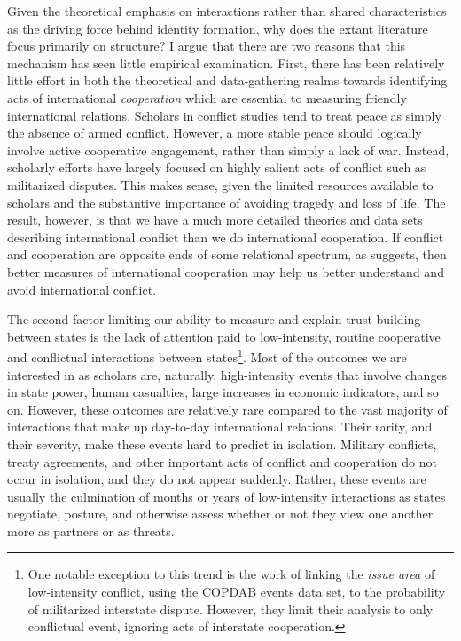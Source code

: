 \documentclass[10pt,]{article}
\begin{document}
Given the theoretical emphasis on interactions rather than shared
characteristics as the driving force behind identity formation, why does
the extant literature focus primarily on structure? I argue that there
are two reasons that this mechanism has seen little empirical
examination. First, there has been relatively little effort in both the
theoretical and data-gathering realms towards identifying acts of
international \emph{cooperation} which are essential to measuring
friendly international relations. Scholars in conflict studies tend to
treat peace as simply the absence of armed conflict. However, a more
stable peace should logically involve active cooperative engagement,
rather than simply a lack of war. Instead, scholarly efforts have
largely focused on highly salient acts of conflict such as militarized
disputes. This makes sense, given the limited resources available to
scholars and the substantive importance of avoiding tragedy and loss of
life. The result, however, is that we have a much more detailed theories
and data sets describing international conflict than we do international
cooperation. If conflict and cooperation are opposite ends of some
relational spectrum, as \citet[118-120]{Ward1982} suggests, then better
measures of international cooperation may help us better understand and
avoid international conflict.

The second factor limiting our ability to measure and explain
trust-building between states is the lack of attention paid to
low-intensity, routine cooperative and conflictual interactions between
states\footnote{One notable exception to this trend is the work of
  \citet{Jungblut2002} linking the \emph{issue area} of low-intensity
  conflict, using the COPDAB events data set, to the probability of
  militarized interstate dispute. However, they limit their analysis to
  only conflictual event, ignoring acts of interstate cooperation.}.
Most of the outcomes we are interested in as scholars are, naturally,
high-intensity events that involve changes in state power, human
casualties, large increases in economic indicators, and so on. However,
these outcomes are relatively rare compared to the vast majority of
interactions that make up day-to-day international relations. Their
rarity, and their severity, make these events hard to predict in
isolation. Military conflicts, treaty agreements, and other important
acts of conflict and cooperation do not occur in isolation, and they do
not appear suddenly. Rather, these events are usually the culmination of
months or years of low-intensity interactions as states negotiate,
posture, and otherwise assess whether or not they view one another more
as partners or as threats.
\end{document}
